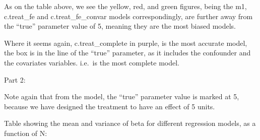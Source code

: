 \documentclass[
]{article}
\begin{document}
As on the table above, we see the yellow, red, and green figures, being
the m1, c.treat\_fe and c.treat\_fe\_convar models correspondingly, are
further away from the ``true'' parameter value of 5, meaning they are
the most biased models.

Where it seems again, c.treat\_complete in purple, is the most accurate
model, the box is in the line of the ``true'' parameter, as it includes
the confounder and the covariates variables. i.e.~is the most complete
model.

Part 2:

Note again that from the model, the ``true'' parameter value is marked
at 5, because we have designed the treatment to have an effect of 5
units.

Table showing the mean and variance of beta for different regression
models, as a function of N:
\end{document}

